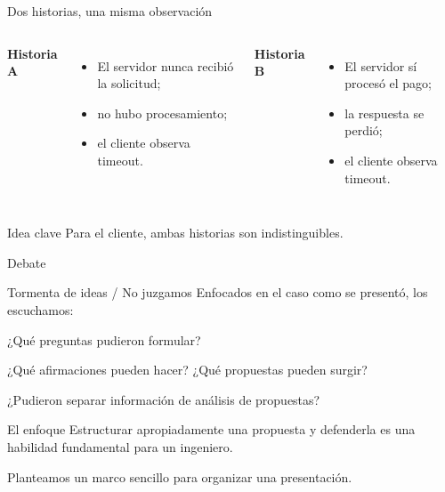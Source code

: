 \documentclass[institutional,screen,none]{ua-engineering-v6-beamer}
\begin{document}
\begin{frame}{Dos historias, una misma observación}
    \begin{columns}[T]
        \textbf{Historia A}
        \begin{itemize}
            \item El servidor nunca recibió la solicitud;
            \item no hubo procesamiento;
            \item el cliente observa timeout.
        \end{itemize}

        \textbf{Historia B}
        \begin{itemize}
            \item El servidor sí procesó el pago;
            \item la respuesta se perdió;
            \item el cliente observa timeout.
        \end{itemize}
    \end{columns}

    \pause

    \begin{block}{Idea clave}
        Para el cliente, ambas historias son indistinguibles.
    \end{block}
\end{frame}

\begin{frame}{Debate}
    \begin{block}{Tormenta de ideas / No juzgamos}
        Enfocados en el caso como se presentó, los escuchamos:
    \end{block}
    \centering
    \Large

    ¿Qué preguntas pudieron formular?

    \vspace{1.4em}
    \pause

    ¿Qué afirmaciones pueden hacer? 
    ¿Qué propuestas pueden surgir?

    \vspace{1.4em}
    \pause

    ¿Pudieron separar información de análisis de propuestas?
\end{frame}

\begin{frame}{El enfoque}
    \centering
    \Large
    Estructurar apropiadamente una propuesta y defenderla es una habilidad fundamental para un ingeniero.
    
    Planteamos un marco sencillo para organizar una presentación.
\end{frame}
\end{document}
